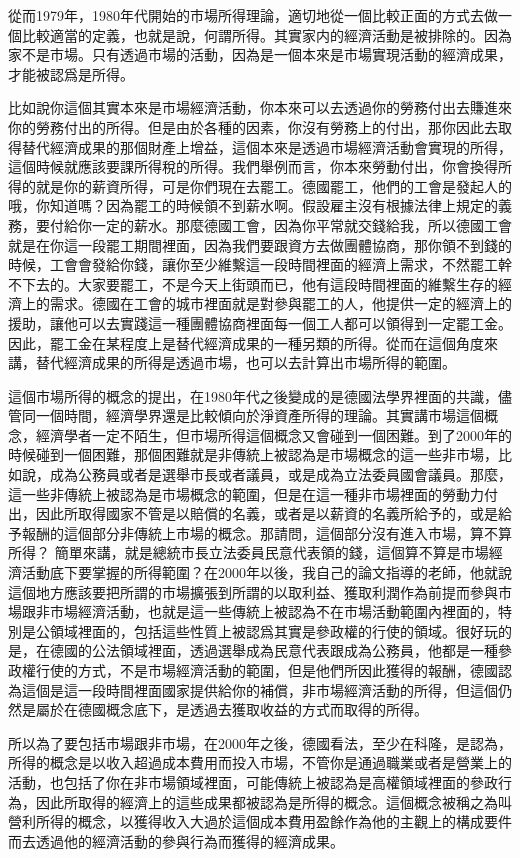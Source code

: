 \documentclass[]{ctexbook}
\begin{document}
從而1979年，1980年代開始的市場所得理論，適切地從一個比較正面的方式去做一個比較適當的定義，也就是說，何謂所得。其實家内的經濟活動是被排除的。因為家不是市場。只有透過市場的活動，因為是一個本來是市場實現活動的經濟成果，才能被認爲是所得。

比如說你這個其實本來是市場經濟活動，你本來可以去透過你的勞務付出去賺進來你的勞務付出的所得。但是由於各種的因素，你沒有勞務上的付出，那你因此去取得替代經濟成果的那個財產上增益，這個本來是透過市場經濟活動會實現的所得，這個時候就應該要課所得稅的所得。我們舉例而言，你本來勞動付出，你會換得所得的就是你的薪資所得，可是你們現在去罷工。德國罷工，他們的工會是發起人的哦，你知道嗎？因為罷工的時候領不到薪水啊。假設雇主沒有根據法律上規定的義務，要付給你一定的薪水。那麼德國工會，因為你平常就交錢給我，所以德國工會就是在你這一段罷工期間裡面，因為我們要跟資方去做團體協商，那你領不到錢的時候，工會會發給你錢，讓你至少維繫這一段時間裡面的經濟上需求，不然罷工幹不下去的。大家要罷工，不是今天上街頭而已，他有這段時間裡面的維繫生存的經濟上的需求。德國在工會的城市裡面就是對參與罷工的人，他提供一定的經濟上的援助，讓他可以去實踐這一種團體協商裡面每一個工人都可以領得到一定罷工金。因此，罷工金在某程度上是替代經濟成果的一種另類的所得。從而在這個角度來講，替代經濟成果的所得是透過市場，也可以去計算出市場所得的範圍。

這個市場所得的概念的提出，在1980年代之後變成的是德國法學界裡面的共識，儘管同一個時間，經濟學界還是比較傾向於淨資產所得的理論。其實講市場這個概念，經濟學者一定不陌生，但市場所得這個概念又會碰到一個困難。到了2000年的時候碰到一個困難，那個困難就是非傳統上被認為是市場概念的這一些非市場，比如說，成為公務員或者是選舉市長或者議員，或是成為立法委員國會議員。那麼，這一些非傳統上被認為是市場概念的範圍，但是在這一種非市場裡面的勞動力付出，因此所取得國家不管是以賠償的名義，或者是以薪資的名義所給予的，或是給予報酬的這個部分非傳統上市場的概念。那請問，這個部分沒有進入市場，算不算所得？ 簡單來講，就是總統市長立法委員民意代表領的錢，這個算不算是市場經濟活動底下要掌握的所得範圍？在2000年以後，我自己的論文指導的老師，他就說這個地方應該要把所謂的市場擴張到所謂的以取利益、獲取利潤作為前提而參與市場跟非市場經濟活動，也就是這一些傳統上被認為不在市場活動範圍內裡面的，特別是公領域裡面的，包括這些性質上被認爲其實是參政權的行使的領域。很好玩的是，在德國的公法領域裡面，透過選舉成為民意代表跟成為公務員，他都是一種參政權行使的方式，不是市場經濟活動的範圍，但是他們所因此獲得的報酬，德國認為這個是這一段時間裡面國家提供給你的補償，非市場經濟活動的所得，但這個仍然是屬於在德國概念底下，是透過去獲取收益的方式而取得的所得。

所以為了要包括市場跟非市場，在2000年之後，德國看法，至少在科隆，是認為，所得的概念是以收入超過成本費用而投入市場，不管你是通過職業或者是營業上的活動，也包括了你在非市場領域裡面，可能傳統上被認為是高權領域裡面的參政行為，因此所取得的經濟上的這些成果都被認為是所得的概念。這個概念被稱之為叫營利所得的概念，以獲得收入大過於這個成本費用盈餘作為他的主觀上的構成要件而去透過他的經濟活動的參與行為而獲得的經濟成果。
\end{document}
